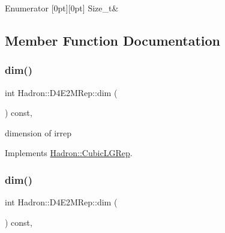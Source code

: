 \begin{DoxyEnumFields}{Enumerator}
[0pt][0pt]{}\mbox{\label{structHadron_1_1D4E2MRep_a34dd7c2c4835f83c1d62506ffb392addae977a2368f7348e3cbe74d7c5b616551}} 
Size\+\_\+t&\\
\hline

\end{DoxyEnumFields}


\subsection{Member Function Documentation}
\mbox{\label{structHadron_1_1D4E2MRep_a278a8c15aa90f5ca19d3ed547d94ed45}} 
\subsubsection{\texorpdfstring{dim()}{dim()}\hspace{0.1cm}{\footnotesize\ttfamily [1/3]}}
{\footnotesize\ttfamily int Hadron\+::\+D4\+E2\+M\+Rep\+::dim (\begin{DoxyParamCaption}{ }\end{DoxyParamCaption}) const\hspace{0.3cm}{\ttfamily [inline]}, {\ttfamily [virtual]}}

dimension of irrep 

Implements \mbox{\hyperlink{structHadron_1_1CubicLGRep_a3acbaea26503ed64f20df693a48e4cdd}{Hadron\+::\+Cubic\+L\+G\+Rep}}.

\mbox{\label{structHadron_1_1D4E2MRep_a278a8c15aa90f5ca19d3ed547d94ed45}} 
\subsubsection{\texorpdfstring{dim()}{dim()}\hspace{0.1cm}{\footnotesize\ttfamily [2/3]}}
{\footnotesize\ttfamily int Hadron\+::\+D4\+E2\+M\+Rep\+::dim (\begin{DoxyParamCaption}{ }\end{DoxyParamCaption}) const\hspace{0.3cm}{\ttfamily [inline]}, {\ttfamily [virtual]}}

